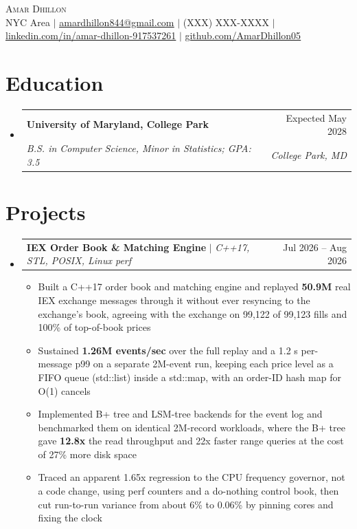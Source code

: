 \documentclass[letterpaper,10pt]{article}
\makeatletter
\newcommand{\resumeItem}[1]{\item{#1}\vspace{-1pt}}
\newcommand{\resumeSubheading}[4]{%
  \vspace{-1pt}\item
  \begin{tabular*}{\textwidth}[t]{l@{\extracolsep{\fill}}r}
    \textbf{#1} & #2 \\
    \textit{#3} & \textit{#4} \\
  \end{tabular*}\vspace{-6pt}%
}
\newcommand{\resumeProjectHeading}[2]{%
  \item
  \begin{tabular*}{\textwidth}{l@{\extracolsep{\fill}}r}
    #1 & #2 \\
  \end{tabular*}\vspace{-6pt}%
}
\newcommand{\resumeSubHeadingListStart}{\begin{itemize}[leftmargin=0in, label={}, itemsep=0pt, topsep=2pt]}
\newcommand{\resumeSubHeadingListEnd}{\end{itemize}}
\newcommand{\resumeItemListStart}{\begin{itemize}[leftmargin=0.18in, itemsep=0pt, topsep=1pt, parsep=0pt]}
\newcommand{\resumeItemListEnd}{\end{itemize}\vspace{0pt}}
\makeatother
\begin{document}
\begin{center}
  {\Huge\scshape\textcolor{accent}{Amar Dhillon}} \\ \vspace{3pt}
  \footnotesize
  NYC Area $|$
  \href{mailto:amardhillon844@gmail.com}{\underline{amardhillon844@gmail.com}} $|$
  (XXX) XXX-XXXX $|$
  \href{https://linkedin.com/in/amar-dhillon-917537261}{\underline{linkedin.com/in/amar-dhillon-917537261}} $|$
  \href{https://github.com/AmarDhillon05}{\underline{github.com/AmarDhillon05}}
\end{center}
\vspace{-6pt}

\section{Education}
\resumeSubHeadingListStart
  \resumeSubheading
    {University of Maryland, College Park}{Expected May 2028}
    {B.S. in Computer Science, Minor in Statistics; GPA: 3.5}{College Park, MD}
\resumeSubHeadingListEnd

\section{Projects}
\resumeSubHeadingListStart
  \resumeProjectHeading
    {\textbf{IEX Order Book \& Matching Engine} $|$ \textit{C++17, STL, POSIX, Linux perf}}{Jul 2026 -- Aug 2026}
  \resumeItemListStart
    \resumeItem{Built a C++17 order book and matching engine and replayed \textbf{50.9M} real IEX exchange messages through it without ever resyncing to the exchange's book, agreeing with the exchange on 99,122 of 99,123 fills and 100\% of top-of-book prices}
    \resumeItem{Sustained \textbf{1.26M events/sec} over the full replay and a 1.2 \textmu{}s per-message p99 on a separate 2M-event run, keeping each price level as a FIFO queue (std::list) inside a std::map, with an order-ID hash map for O(1) cancels}
    \resumeItem{Implemented B+ tree and LSM-tree backends for the event log and benchmarked them on identical 2M-record workloads, where the B+ tree gave \textbf{12.8x} the read throughput and 22x faster range queries at the cost of 27\% more disk space}
    \resumeItem{Traced an apparent 1.65x regression to the CPU frequency governor, not a code change, using perf counters and a do-nothing control book, then cut run-to-run variance from about 6\% to 0.06\% by pinning cores and fixing the clock}
  \resumeItemListEnd
\resumeSubHeadingListEnd
\end{document}
